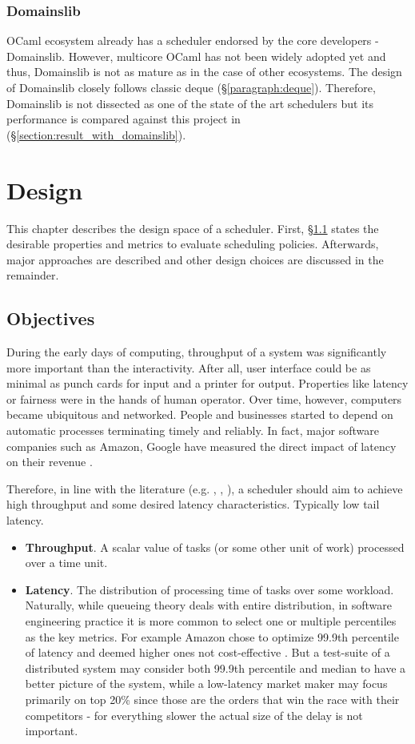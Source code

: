 \documentclass[12pt,a4paper,twoside]{report}
\begin{document}
\subsection{Domainslib}

OCaml ecosystem already has a scheduler endorsed by the core developers \cite{ocamlmul59:online} - Domainslib. However, multicore OCaml has not been widely adopted yet and thus, Domainslib is not as mature as in the case of other ecosystems. The design of Domainslib closely follows classic deque (\S\ref{paragraph:deque}). Therefore, Domainslib is not dissected as one of the state of the art schedulers but its performance is compared against this project in (\S\ref{section:result_with_domainslib}).

\chapter{Design}
This chapter describes the design space of a scheduler. First, \S\ref{section:objectives} states the desirable properties and metrics to evaluate scheduling policies. Afterwards, major approaches are described and other design choices are discussed in the remainder. 

\section{Objectives}
\label{section:objectives}
During the early days of computing, throughput of a system was significantly more important than the interactivity. After all, user interface could be as minimal as punch cards for input and a printer for output. Properties like latency or fairness were in the hands of human operator. Over time, however, computers became ubiquitous and networked. People and businesses started to depend on automatic processes terminating timely and reliably. In fact, major software companies such as Amazon, Google have measured the direct impact of latency on their revenue \cite{Kleppmann2017-en}.

Therefore, in line with the literature (e.g. \cite{8057206}, \cite{latthrough}, \cite{Sun2021}), a scheduler should aim to achieve high throughput and some desired latency characteristics. Typically low tail latency.
\begin{itemize}
    \item \textbf{Throughput}. A scalar value of tasks (or some other unit of work) processed over a time unit.
    \item \textbf{Latency}. The distribution of processing time of tasks over some workload. Naturally, while queueing theory deals with entire distribution, in software engineering practice it is more common to select one or multiple percentiles as the key metrics. For example Amazon chose to optimize 99.9th percentile of latency and deemed higher ones not cost-effective \cite{Kleppmann2017-en}. But a test-suite of a distributed system may consider both 99.9th percentile and median to have a better picture of the system, while a low-latency market maker may focus primarily on top 20\% since those are the orders that win the race with their competitors - for everything slower the actual size of the delay is not important. 
\end{itemize}
\end{document}
